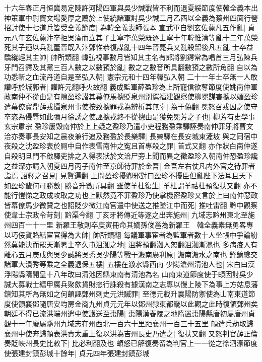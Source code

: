 十六年春正月恒冀易定陳許河陽四軍與吳少誠戰皆不利而退夏綏節度使韓全義本出神策軍中尉竇文場愛厚之薦於上使統諸軍討吳少誠二月乙酉以全義為蔡州四面行營招討使十七道兵皆受全義節度|{
	為韓全義喪師張本}
宣武軍自劉玄佐薨凡五作亂|{
	貞元八年玄佐薨汴卒拒吳湊而立其子士寧李萬榮既逐士寧十年韓惟清等亂十二年萬榮死其子迺以兵亂董晉既入汴鄧惟恭復謀亂十四年晉薨兵又亂殺留後凡五亂}
士卒益驕縱輕其主帥|{
	帥所類翻}
韓弘視事數月皆知其主名有郎將劉鍔常為唱首三月弘陳兵牙門召鍔及其黨三百人數之以數預於亂|{
	數之之數音所具翻數預之數所角翻}
自以為功悉斬之血流丹道自是至弘入朝|{
	憲宗元和十四年韓弘入朝}
二十一年士卒無一人敢讙呼於城郭者|{
	讙許元翻呼火故翻}
義成監軍薛盈珍為上所寵信欲奪節度使姚南仲軍政南仲不從由是有隙盈珍譛其幕僚馬摠貶泉州别駕福建觀察使柳冕謀害摠以媚盈珍遣幕僚寶鼎薛戎攝泉州事使按致摠罪戎為辨析其無辜|{
	為于偽翻}
冕怒召戎囚之使守卒恣為侵辱如此彌月徐誘之使誣摠戎終不從摠由是獲免冕芳之子也|{
	柳芳有史學事玄宗肅宗}
盈珍屢毁南仲於上上疑之盈珍乃遣小吏程務盈乘驛誣奏南仲罪牙將曹文洽亦奏事長安知之晨夜兼行追及務盈於長樂驛|{
	長樂驛在長安城東滻坡}
與之同宿中夜殺之沈盈珍表於厠中自作表雪南仲之寃且首專殺之罪|{
	首式又翻}
亦作狀白南仲遂自殺明旦門不啟驛吏排之入得表狀於文洽尸旁上聞而異之徵盈珍入朝南仲恐盈珍讒之益深亦請入朝夏四月丙子南仲至京師待罪於金吾|{
	金吾左右仗凡内外官之待罪者詣焉}
詔釋之召見|{
	見賢遍翻}
上問盈珍擾卿邪對曰盈珍不擾臣但亂陛下法耳且天下如盈珍輩何可勝數|{
	勝音升數所具翻}
雖使羊杜復生|{
	羊杜謂羊祜杜預復扶又翻}
亦不能行愷悌之政成攻取之功也上默然竟不罪盈珍乃使掌機密盈珍又言於上曰南仲惡政皆幕僚馬少微贊之也詔貶少微江南官遣中使送之推墜江中而死|{
	推吐雷翻}
黔中觀察使韋士宗政令苛刻|{
	黔渠今翻}
丁亥牙將傳近等逐之出奔施州|{
	九域志黔州東北至施州四百一十一里}
新羅王敬則卒庚寅冊命其嫡孫俊邕為新羅王　韓全義素無勇畧專以巧佞貨賂結宦官得為大帥|{
	帥所類翻}
每議軍事宦者為監軍者數十人坐帳中爭論紛然莫能決而罷天漸暑士卒久屯沮洳之地|{
	沮將預翻洳人恕翻沮洳漸濕也}
多病疫人有離心五月庚戌與吳少誠將吳秀吳少陽等戰于溵南廣利原|{
	溵南溵水之南也}
鋒鏑纔交諸軍大潰秀等乘之全義退保五樓|{
	五樓在溵水縣西南}
少陽滄州清池人也|{
	宋白曰漢浮陽縣隋開皇十八年改曰清池因縣東南有清池為名}
山南東道節度使于頔因討吳少誠大募戰士繕甲厲兵聚歛貨財恣行誅殺有據漢南之志專以慢上陵下為事上方姑息藩鎮知其所為無如之何頔誣鄧州刺史元洪贓罪|{
	至德元載升襄陽防禦使為山南東道節度使領襄鄧隨唐安均房金商九州貞元元年以鄧州隸東都畿以此觀之此時復領鄧州矣}
朝廷不得已流洪端州遣中使護送至棗陽|{
	棗陽漢舂陵之地隋置棗陽縣唐初屬唐州貞觀十一年廢屬隨州九域志在州西北一百六十里距襄州一百三十五里}
頔遣兵劫取歸襄州中使奔歸頔表洪責太重上復以洪為吉州長史乃遣之|{
	復扶又翻}
又怒判官薛正倫奏貶峽州長史比敕下|{
	比必利翻及也}
頔怒已解復奏留為判官上一一從之徐泗濠節度使張建封鎮彭城十餘年|{
	貞元四年張建封鎮彭城}
